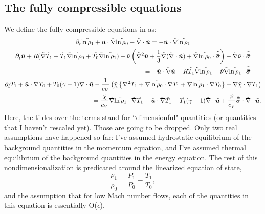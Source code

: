 \subsection{The fully compressible equations}
We define the fully compressible equations in \citet{anders&brown2017} as:
\begin{gather}
\partial_{\tilde{t}} \tilde{\ln \rho_1} + \tilde{\bm{u}}\cdot\tilde{\nabla} \tilde{\ln\rho_0} + \tilde{\nabla}\cdot\tilde{\bm{u}} = -\tilde{\bm{u}}\cdot\tilde{\nabla}\tilde{\ln\rho_1} 
\label{eqn:unscaled_continuity}
\\
\begin{split}
\partial_{\tilde{t}} \tilde{\bm{u}} + R(\tilde{\nabla} \tilde{T_1} + \tilde{T_1} \tilde{\nabla}\tilde{\ln\rho_0} + \tilde{T_0} \tilde{\nabla}\tilde{\ln\rho_1})
- \tilde{\nu}\left(\tilde{\nabla}^2 \tilde{\bm{u}} + \frac{1}{3}\tilde{\nabla}(\tilde{\nabla}\cdot\tilde{\bm{u}}) + \tilde{\nabla}\tilde{\ln\rho_0}\cdot\tilde{\bm{\bar{\bar{\sigma}}}}\right)
- \tilde{\nabla}\tilde{\nu}\cdot\tilde{\bm{\bar{\bar{\sigma}}}}
\\= -\tilde{\bm{u}}\cdot\tilde{\nabla}\tilde{\bm{u}} - R\tilde{T_1}\tilde{\nabla}\tilde{\ln\rho_1} + \tilde{\nu}\tilde{\nabla}\tilde{\ln\rho_1}\cdot\tilde{\bm{\bar{\bar{\sigma}}}}
\end{split}
\label{eqn:unscaled_momentum}
\\
\begin{split}
\partial_{\tilde{t}} \tilde{T_1} + \tilde{\bm{u}}\cdot\tilde{\nabla} \tilde{T_0} + \tilde{T_0}(\gamma-1)\tilde{\nabla}\cdot\tilde{\bm{u}} 
- \frac{1}{c_V}\left(\tilde{\chi}\left\{\tilde{\nabla}^2 \tilde{T_1} + \tilde{\nabla}\tilde{\ln\rho_0} \cdot\tilde{\nabla} \tilde{T_1} + \tilde{\nabla}\tilde{\ln\rho_1}\cdot\tilde{\nabla} \tilde{T_0}\right\} 
+ \tilde{\nabla}\tilde{\chi}\cdot\tilde{\nabla} \tilde{T_1}\right)
\\= \frac{\tilde{\chi}}{c_V}\tilde{\nabla}\tilde{\ln\rho_1}\cdot\tilde{\nabla} \tilde{T_1} - \tilde{\bm{u}}\cdot\tilde{\nabla} \tilde{T_1} - \tilde{T_1}(\gamma-1)\tilde{\nabla}\cdot\tilde{\bm{u}}
+ \frac{\tilde{\nu}}{c_V}\tilde{\bm{\bar{\bar{\sigma}}}}\cdot\tilde{\nabla}\cdot\tilde{\bm{u}}.
\end{split}
\label{eqn:unscaled_energy}
\end{gather}
Here, the tildes over the terms stand for ``dimensionful" quantities (or quantities that I haven't rescaled yet). 
Those are going to be dropped. 
Only two real assumptions have happened so far: I've assumed hydrostatic equilibrium of the background quantities in the momentum equation, and I've assumed thermal equilibrium of the background quantities in the energy equation.
The rest of this nondimensionalization is predicated around the linearized equation of state,
$$
\frac{\rho_1}{\rho_0} = \frac{P_1}{P_0} - \frac{T_1}{T_0},
$$
and the assumption that for low Mach number flows, each of the quantities in this equation is essentially O($\epsilon$).
